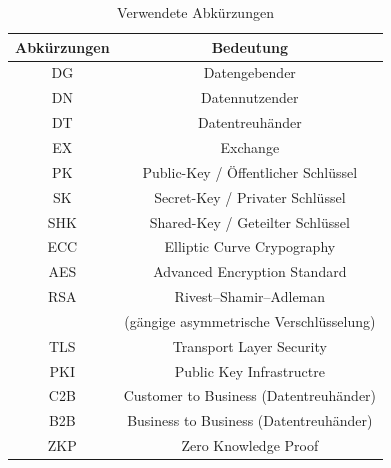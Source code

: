 \documentclass[
	fontsize=11pt,
	headings=small,
	parskip=half,           %
	bibliography=totoc,
	numbers=noenddot,       %
	open=any,               %
]{scrreprt}
\begin{document}
\begin{table}[H]
    \centering
    \begin{tabular}{|c|c|}
        \hline
        \textbf{Abkürzungen} & \textbf{Bedeutung} \\
        \hline
        DG & Datengebender \\
        \hline
        DN & Datennutzender \\
        \hline
        DT & Datentreuhänder \\
        \hline
        EX &Exchange \\
        \hline
        PK & Public-Key / Öffentlicher Schlüssel \\
        \hline
        SK & Secret-Key / Privater Schlüssel \\
        \hline
        SHK & Shared-Key / Geteilter Schlüssel \\
        \hline
        ECC & Elliptic Curve Crypography \\
        \hline
        AES & Advanced Encryption Standard \\
        \hline
        RSA & Rivest–Shamir–Adleman \\ & (gängige asymmetrische Verschlüsselung) \\
        \hline
        TLS & Transport Layer Security \\
        \hline
        PKI & Public Key Infrastructre\\
        \hline
        C2B & Customer to Business (Datentreuhänder)\\
        \hline
        B2B & Business to Business (Datentreuhänder)\\
        \hline
        ZKP & Zero Knowledge Proof \\
        \hline
    \end{tabular}
    \caption{Verwendete Abkürzungen}
    \label{tab:abkürzungen}
\end{table}
\end{document}
